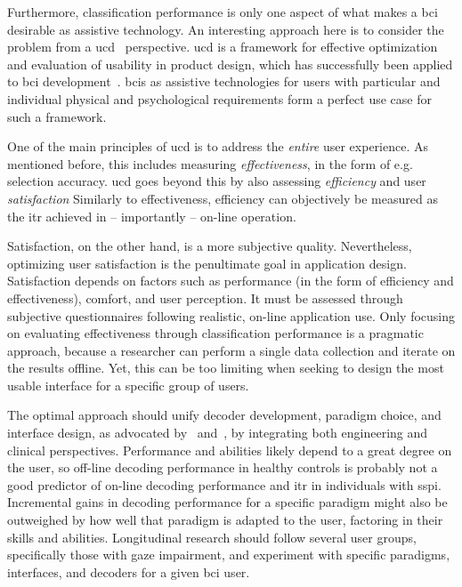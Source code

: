 Furthermore, classification performance is only one aspect of what makes a \ac{bci}
desirable as assistive technology.
An interesting approach here is to consider the problem from a
\ac{ucd}~\cite{Standardization2009} perspective.
\Ac{ucd} is a framework for effective optimization and evaluation of usability
in product design, which has successfully been applied to \ac{bci}
development~\cite{Schreuder2013,Kuebler2014,Han2022}.
\Acp{bci} as assistive technologies for users with particular and individual
physical and psychological requirements form a perfect use case for such a framework.

One of the main principles of \ac{ucd} is to address the \emph{entire} user
experience.
As mentioned before, this includes measuring \emph{effectiveness}, in the form
of e.g. selection accuracy.
\Ac{ucd} goes beyond this by also assessing \emph{efficiency} and user
\emph{satisfaction}
Similarly to effectiveness, efficiency can objectively be measured as the \ac{itr}
achieved in -- importantly -- on-line operation.

Satisfaction, on the other hand, is a more subjective quality.
Nevertheless, optimizing user satisfaction is the penultimate goal in
application design.
Satisfaction depends on factors such as performance (in the form of efficiency
and effectiveness), comfort, and user perception.
It must be assessed through subjective questionnaires following realistic, on-line
application use\cite{Kuebler2014}.
Only focusing on evaluating effectiveness through classification performance is
a pragmatic approach, because a researcher can perform a single
data collection and iterate on the results offline.
Yet, this can be too limiting when seeking to design the most usable interface
for a specific group of users.

The optimal approach should unify decoder development, paradigm choice, and interface
design, as advocated by~\textcite{Pan2022} and~\textcite{Fouad2020}, by integrating both
engineering and clinical perspectives.
Performance and abilities likely depend to a great degree on the user,
so off-line decoding performance in healthy controls is probably not a good
predictor of on-line decoding performance and \ac{itr} in individuals with
\ac{sspi}.
Incremental gains in decoding performance for a specific paradigm might
also be outweighed by how well that paradigm is adapted to the user, factoring in
their skills and abilities.
Longitudinal research should follow several user groups, specifically those with gaze
impairment, and experiment with specific paradigms, interfaces, and decoders for
a given \ac{bci} user.

